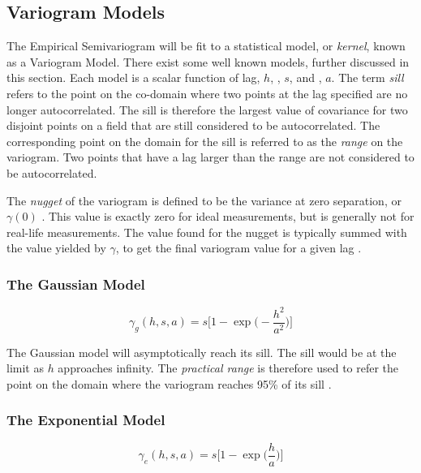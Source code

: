 \subsection{Variogram Models} \label{sec:variomodels}
The Empirical Semivariogram will be fit to a statistical model, or \textit{kernel}, known as a Variogram Model. There exist some well known models, further discussed in this section. Each model is a scalar function of lag, $h$, , $s$, and , $a$. The term \textit{sill} refers to the point on the co-domain where two points at the lag specified are no longer autocorrelated. The sill is therefore the largest value of covariance for two disjoint points on a field that are still considered to be autocorrelated. The corresponding point on the domain for the sill is referred to as the \textit{range} on the variogram. Two points that have a lag larger than the range are not considered to be autocorrelated.

The \textit{nugget} of the variogram is defined to be the variance at zero separation, or $\gamma(0)$ \cite{matheron:geostat}. This value is exactly zero for ideal measurements, but is generally not for real-life measurements. The value found for the nugget is typically summed with the value yielded by $\gamma$, to get the final variogram value for a given lag \cite{goov:97}.

\subsubsection{The Gaussian Model}

\begin{equation}
	\gamma_g(h, s, a) = s \Bigg[ 1 - \exp \Bigg( -\dfrac{h^2}{a^2} \Bigg) \Bigg]
	\label{eq:gauss_model}
\end{equation}

The Gaussian model will asymptotically reach its sill. The sill would be at the limit as $h$ approaches infinity. The \textit{practical range} is therefore used to refer the point on the domain where the variogram reaches 95\% of its sill \cite{goov:97}.

\subsubsection{The Exponential Model}

\begin{equation}
	\gamma_e(h, s, a) = s \Bigg[ 1 - \exp \Bigg( \dfrac{h}{a} \Bigg) \Bigg]
	\label{eq:exp_model}
\end{equation}

